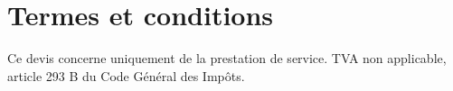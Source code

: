 \documentclass[11pt,a4paper]{article}
\begin{document}
\section*{Termes et conditions}
Ce devis concerne uniquement de la prestation de service. \newline
TVA non applicable, article 293 B du Code Général des Impôts. \newline
\newline
\newline

\noindent{}

\newpage


\end{document}
